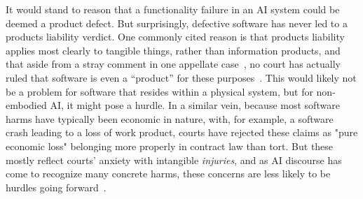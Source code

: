 \documentclass[acmconf,manuscript,screen,natbib=true]{acmart}
\begin{document}

It would stand to reason that a functionality failure in an AI system could be deemed a product defect. But surprisingly, defective software has never led to a products liability verdict. One commonly cited reason is that products liability applies most clearly to tangible things, rather than information products, and that aside from a stray comment in one appellate case~\cite{Winter}, no court has actually ruled that software is even a ``product'' for these purposes~\cite{calo2015robotics, engstrom20133D}. This would likely not be a problem for software that resides within a physical system, but for non-embodied AI, it might pose a hurdle. In a similar vein, because most software harms have typically been economic in nature, with, for example, a software crash leading to a loss of work product, courts have rejected these claims as "pure economic loss" belonging more properly in contract law than tort. But these mostly reflect courts' anxiety with intangible \textit{injuries}, and as AI discourse has come to recognize many concrete harms, these concerns are less likely to be hurdles going forward~\cite{choi2019crashworthy}.
\end{document}
